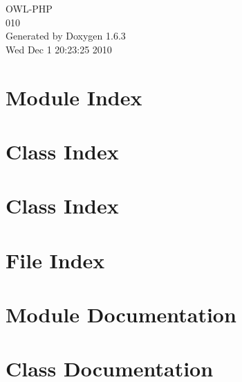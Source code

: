 \documentclass[a4paper]{book}
\begin{document}
\begin{titlepage}
\vspace*{7cm}
\begin{center}
{\Large OWL-\/PHP \\[1ex]\large 010 }\\
\vspace*{1cm}
{\large Generated by Doxygen 1.6.3}\\
\vspace*{0.5cm}
{\small Wed Dec 1 20:23:25 2010}\\
\end{center}
\end{titlepage}
\clearemptydoublepage
{}
\tableofcontents
\clearemptydoublepage
{}
\chapter{Module Index}

\chapter{Class Index}

\chapter{Class Index}

\chapter{File Index}

\chapter{Module Documentation}




\chapter{Class Documentation}































\end{document}
